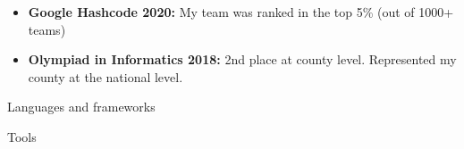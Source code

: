 
\begin{itemize}

\item \textbf{Google Hashcode 2020:} My team was ranked in the top 5\% (out of 1000+ teams)

\item \textbf{Olympiad in Informatics 2018:} 2nd place at county level. Represented my county at the national level.

\end{itemize}








\begin{center}
Languages and frameworks
\end{center}

\divider
{}
\divider
{}
\divider
{}
\divider
{}
\divider
{}
\divider
{}
\divider
{}
\divider
{}
\divider
{}
\divider
{}

\begin{center}
Tools
\end{center}

\divider
{}
\divider
{}



